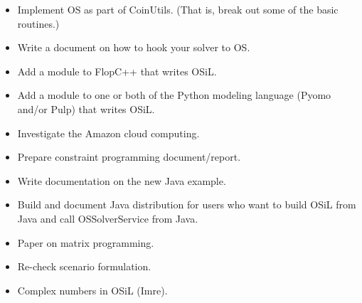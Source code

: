 
\ifbible

\label{section:wishlist} 

\begin{itemize}

\item Implement OS as part of CoinUtils. (That is, break out some of the basic routines.)

\item Write a document on how to hook your solver to OS.

\item Add a module to FlopC++ that writes OSiL.

\item Add a module to one or both of the Python modeling language (Pyomo and/or Pulp) that writes OSiL.

\item Investigate the Amazon cloud computing.




\item Prepare constraint programming document/report.


\item Write documentation on the new Java example.

\item Build and document Java distribution for users who want to build OSiL from Java and 
call OSSolverService from Java. 

\item Paper on matrix programming.

\item Re-check scenario formulation.


\item Complex numbers in OSiL (Imre).


\end{itemize}
